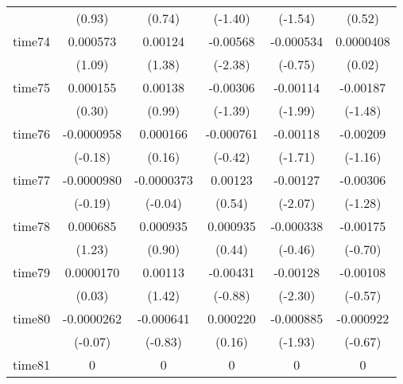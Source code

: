 \begin{table}[htbp]
\begin{tabular}{l*{5}{c}}
            &      (0.93)         &      (0.74)         &     (-1.40)         &     (-1.54)         &      (0.52)         \\
time74      &    0.000573         &     0.00124         &    -0.00568\sym{*}  &   -0.000534         &   0.0000408         \\
            &      (1.09)         &      (1.38)         &     (-2.38)         &     (-0.75)         &      (0.02)         \\
time75      &    0.000155         &     0.00138         &    -0.00306         &    -0.00114\sym{*}  &    -0.00187         \\
            &      (0.30)         &      (0.99)         &     (-1.39)         &     (-1.99)         &     (-1.48)         \\
time76      &  -0.0000958         &    0.000166         &   -0.000761         &    -0.00118         &    -0.00209         \\
            &     (-0.18)         &      (0.16)         &     (-0.42)         &     (-1.71)         &     (-1.16)         \\
time77      &  -0.0000980         &  -0.0000373         &     0.00123         &    -0.00127\sym{*}  &    -0.00306         \\
            &     (-0.19)         &     (-0.04)         &      (0.54)         &     (-2.07)         &     (-1.28)         \\
time78      &    0.000685         &    0.000935         &    0.000935         &   -0.000338         &    -0.00175         \\
            &      (1.23)         &      (0.90)         &      (0.44)         &     (-0.46)         &     (-0.70)         \\
time79      &   0.0000170         &     0.00113         &    -0.00431         &    -0.00128\sym{*}  &    -0.00108         \\
            &      (0.03)         &      (1.42)         &     (-0.88)         &     (-2.30)         &     (-0.57)         \\
time80      &  -0.0000262         &   -0.000641         &    0.000220         &   -0.000885         &   -0.000922         \\
            &     (-0.07)         &     (-0.83)         &      (0.16)         &     (-1.93)         &     (-0.67)         \\
time81      &           0         &           0         &           0         &           0         &           0         \\

\end{tabular}
\end{table}
